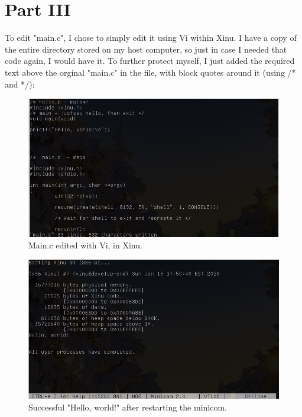 \documentclass{article}
\begin{document}
\section{Part III}
To edit "main.c", I chose to simply edit it using Vi within Xinu. I have a copy of the entire directory 
stored on my host computer, so just in case I needed
that code again, I would have it. To further protect myself, I just added the required text above the orginal "main.c"
in the file, with block quotes around it (using /* and */):
\begin{figure}[ht!]
  \includegraphics[width=\textwidth]{mainmod.png}
  \caption{Main.c edited with Vi, in Xinu.}
\end{figure}
\begin{figure}[ht!]
  \includegraphics[width=\textwidth]{mainhello.png}
  \caption{Successful "Hello, world!" after restarting the minicom.}
\end{figure}
\end{document}
